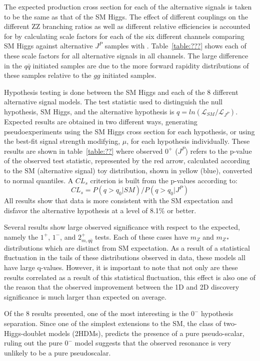 The expected production cross section for each of the alternative 
signals is taken to be the same as that of the SM Higgs.  The 
effect of different couplings on the different ZZ branching 
ratios as well as different relative efficiencies is accounted
for by calculating scale factors for each of the six different 
channels comparing SM Higgs against alternative $J^P$ samples 
with \JHUGen.  Table~\ref{table:???} shows each of these scale
factors for all alternative signals in all channels.  The large
difference in the $q\bar{q}$ initiated samples are due to the
more forward rapidity distributions of these samples relative to 
the $gg$ initiated samples.  

Hypothesis testing is done between the SM Higgs and each of the 
8 different alternative signal models.  The test statistic used
to distinguish the null hypothesis, SM Higgs, and the alternative 
hypothesis is $q=ln(\mathscr{L}_{SM}/\mathscr{L}_{J^P})$. 
Expected results are
obtained in two different ways, generating pseudoexperiments using
the SM Higgs cross section for each hypothesis, 
or using the best-fit signal strength modifying, $\mu$, for each
hypothesis individually.  These results are shown in 
table~\ref{table:??} where observed $0^+$ ($J^P$) refers to the 
p-value 
of the observed test statistic, represented by the red arrow,
calculated according to the SM (alternative signal) toy 
distribution, shown in yellow (blue), converted to normal 
quantiles.  A $CL_s$ criterion is built from the p-values 
according to:
\begin{equation}
CL_s = P(q>q_0|SM)/P(q>q_0|J^P)
\end{equation}  
All results show that data is more consistent with 
the SM expectation and disfavor the alternative hypothesis
at a level of 8.1\% or better.  

Several results show large observed significance with respect to 
the expected, namely the $1^+$, $1^-$, and $2_{m,q\bar{q}}^+$ tests.
Each of these cases have $m_{Z}$ and $m_{Z*}$ distributions which are
distinct from SM expectation.  As a result of a statistical
fluctuation in the tails of these distributions observed in data,
these models all have large q-values.  However, it is important
to note that not only are these results correlated as a result
of this statistical fluctuation, this effect is also one of the 
reason that the observed improvement between the 1D and 2D 
discovery significance is much larger than expected on average.

Of the 8 results presented, one of the most interesting is the 
$0^-$ hypothesis separation.  Since one of the simplest extensions
to the SM, the class of two-Higgs-doublet models (2HDMs), 
predicts the presence of a pure pseudo-scalar, ruling out the 
pure $0^-$ model suggests that the observed resonance is very 
unlikely to be a pure pseudoscalar. 


